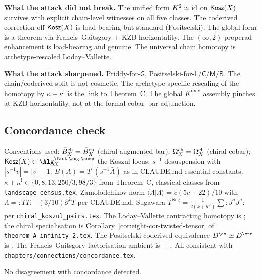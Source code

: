 \textbf{What the attack did not break.} The unified form
$K^{2}\simeq\mathrm{id}$ on $\mathsf{Kosz}(X)$ survives with explicit chain-level
witnesses on all five classes. The coderived correction off
$\mathsf{Kosz}(X)$ is load-bearing but standard (Positselski). The
global form is a theorem via Francis--Gaitsgory + KZB
horizontality. The $(\infty,2)$-properad enhancement is
load-bearing and genuine. The universal chain homotopy is
archetype-rescaled Loday--Vallette.

\textbf{What the attack sharpened.} Priddy-for-$\mathsf{G}$,
Positselski-for-$\mathsf{L/C/M/B}$. The chain/coderived split is
not cosmetic. The archetype-specific rescaling of the homotopy by
$\kappa+\kappa^{!}$ is the link to Theorem~C. The global
$K^{\mathrm{univ}}$ assembly pinches at KZB horizontality, not at
the formal cobar--bar adjunction.

\subsection*{Concordance check}

Conventions used: $\bar{B}^{\mathrm{ch}}_X = \bar{B}^{\mathrm{ch}}_X$ (chiral
augmented bar); $\Omega^{\mathrm{ch}}_X = \Omega^{\mathrm{ch}}_X$ (chiral cobar);
$\Kosz(X) \subset \Alg^{\fact,\aug,\comp}_X$ the Koszul locus;
$s^{-1}$ desuspension with $|s^{-1}v| = |v|-1$;
$B(A) = T^{c}(s^{-1}\bar A)$ as in
CLAUDE.md essential-constants. $\kappa+\kappa^{!}\in\{0,8,13,250/3,98/3\}$
from Theorem~C, classical classes from
\texttt{landscape\_census.tex}. Zamolodchikov norm
$\langle\Lambda|\Lambda\rangle = c(5c+22)/10$ with
$\Lambda = {:}TT{:} - (3/10)\partial^{2}T$ per CLAUDE.md.
Sugawara $T^{\mathrm{Sug}} = \tfrac{1}{2(k+h^{\vee})}\sum{:}J^{a}J^{a}{:}$
per \texttt{chiral\_koszul\_pairs.tex}. The
Loday--Vallette contracting homotopy is
\cite[eq.\ (2.17)]{LV12}; the chiral specialisation is
Corollary~\ref{cor:eight-cor-twisted-tensor} of
\texttt{theorem\_A\_infinity\_2.tex}. The Positselski coderived
equivalence $D^{\co}\simeq D^{\ctr}$ is
\cite[App.\ A.5]{Positselski2011}. The Francis--Gaitsgory
factorisation ambient is
\cite[\S4.2]{Francis2012} + \cite[Ch.\ IV.5]{GR17}. All consistent
with \texttt{chapters/connections/concordance.tex}.

No disagreement with concordance detected.

